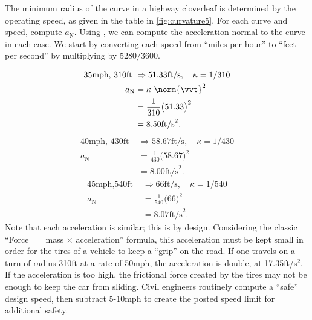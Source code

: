 \begin{example}\label{ex_curvature5}
The minimum radius of the curve in a highway cloverleaf is determined by the operating speed, as given in the table in \autoref{fig:curvature5}. For each curve and speed, compute $a_\text{N}$.
\solution
{}
Using , we can compute the acceleration normal to the curve in each case. We start by converting each speed from ``miles per hour'' to ``feet per second'' by multiplying by $5280/3600$.

\begin{align*}
\text{35mph, 310ft } &\Rightarrow 51.33\text{ft/s},\quad \kappa = 1/310 \\
			a_\text{N}&= \kappa\ \norm{\vvt}^2\\ 
							&= \frac1{310}\bigl(51.33\bigr)^2 \\
							&= 8.50\text{ft/s}^2.
\end{align*}
\begin{align*}
\text{40mph, 430ft } &\Rightarrow 58.67\text{ft/s},\quad \kappa = 1/430 \\
			a_\text{N}&= \frac1{430}\bigl(58.67\bigr)^2 \\
							&= 8.00\text{ft/s}^2.
\end{align*}
\begin{align*}
\text{45mph,540ft } &\Rightarrow 66\text{ft/s},\quad \kappa = 1/540 \\
			a_\text{N}&= \frac1{540}\bigl(66\bigr)^2 \\
							&= 8.07\text{ft/s}^2.
\end{align*}
Note that each acceleration is similar; this is by design. Considering the classic ``Force $=$ mass $\times$ acceleration'' formula, this acceleration must be kept small in order for the tires of a vehicle to keep a ``grip'' on the road. If one travels on a turn of radius 310ft at a rate of 50mph, the acceleration is double, at 17.35ft/s$^2$. If the acceleration is too high, the frictional force created by the tires may not be enough to keep the car from sliding. Civil engineers routinely compute a ``safe'' design speed, then subtract 5-10mph to create the posted speed limit for additional safety.
\end{example}

